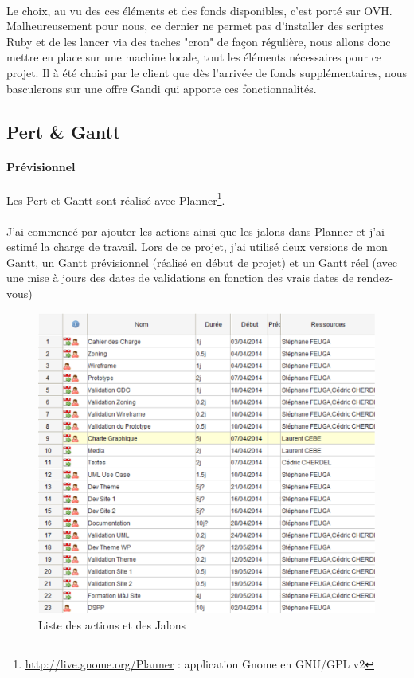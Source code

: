 \documentclass[11pt,a4paper]{report}
\begin{document}
			\paragraph*{}Le choix, au vu des ces éléments et des fonds disponibles, c'est porté sur OVH. Malheureusement pour nous, ce dernier ne permet pas d'installer des scriptes Ruby et de les lancer via des taches "cron" de façon régulière, nous allons donc mettre en place sur une machine locale, tout les éléments nécessaires pour ce projet. Il à été choisi par le client que dès l'arrivée de fonds supplémentaires, nous basculerons sur une offre Gandi qui apporte ces fonctionnalités.
			\newpage
		\subsection{Pert \& Gantt}
			\paragraph*{Prévisionnel}Les Pert et Gantt sont réalisé avec Planner\footnote{\url{http://live.gnome.org/Planner} : application Gnome en GNU/GPL v2}.
			\paragraph*{}J'ai commencé par ajouter les actions ainsi que les jalons dans Planner et j'ai estimé la charge de travail. Lors de ce projet, j'ai utilisé deux versions de mon Gantt, un Gantt prévisionnel (réalisé en début de projet) et un Gantt réel (avec une mise à jours des dates de validations en fonction des vrais dates de rendez-vous)

				\begin{figure}[H]
					\centering
					\includegraphics[height=10cm]{Gantt_Previsionnel_1.eps}
					\caption{Liste des actions et des Jalons}
					\label{fig:List des Actions Gantt Previsionnel}
				\end{figure}\newpage
\end{document}
